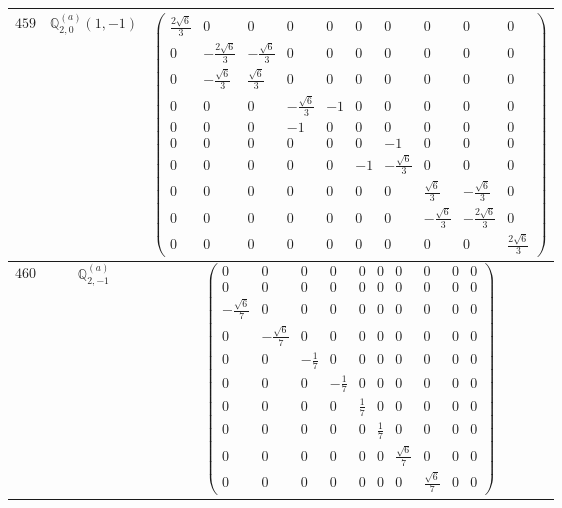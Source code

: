 \documentclass[fleqn,8pt,landscape]{jsarticle}
\begin{document}
\begin{center}
\begin{longtable}{ccc}
$ 459 $ & $ \mathbb{Q}_{2,0}^{(a)}(1,-1) $ & $ \begin{pmatrix} \frac{2 \sqrt{6}}{3} & 0 & 0 & 0 & 0 & 0 & 0 & 0 & 0 & 0 \\ 0 & - \frac{2 \sqrt{6}}{3} & - \frac{\sqrt{6}}{3} & 0 & 0 & 0 & 0 & 0 & 0 & 0 \\ 0 & - \frac{\sqrt{6}}{3} & \frac{\sqrt{6}}{3} & 0 & 0 & 0 & 0 & 0 & 0 & 0 \\ 0 & 0 & 0 & - \frac{\sqrt{6}}{3} & -1 & 0 & 0 & 0 & 0 & 0 \\ 0 & 0 & 0 & -1 & 0 & 0 & 0 & 0 & 0 & 0 \\ 0 & 0 & 0 & 0 & 0 & 0 & -1 & 0 & 0 & 0 \\ 0 & 0 & 0 & 0 & 0 & -1 & - \frac{\sqrt{6}}{3} & 0 & 0 & 0 \\ 0 & 0 & 0 & 0 & 0 & 0 & 0 & \frac{\sqrt{6}}{3} & - \frac{\sqrt{6}}{3} & 0 \\ 0 & 0 & 0 & 0 & 0 & 0 & 0 & - \frac{\sqrt{6}}{3} & - \frac{2 \sqrt{6}}{3} & 0 \\ 0 & 0 & 0 & 0 & 0 & 0 & 0 & 0 & 0 & \frac{2 \sqrt{6}}{3} \end{pmatrix} $ \\ \hline
$ 460 $ & $ \mathbb{Q}_{2,-1}^{(a)} $ & $ \begin{pmatrix} 0 & 0 & 0 & 0 & 0 & 0 & 0 & 0 & 0 & 0 \\ 0 & 0 & 0 & 0 & 0 & 0 & 0 & 0 & 0 & 0 \\ - \frac{\sqrt{6}}{7} & 0 & 0 & 0 & 0 & 0 & 0 & 0 & 0 & 0 \\ 0 & - \frac{\sqrt{6}}{7} & 0 & 0 & 0 & 0 & 0 & 0 & 0 & 0 \\ 0 & 0 & - \frac{1}{7} & 0 & 0 & 0 & 0 & 0 & 0 & 0 \\ 0 & 0 & 0 & - \frac{1}{7} & 0 & 0 & 0 & 0 & 0 & 0 \\ 0 & 0 & 0 & 0 & \frac{1}{7} & 0 & 0 & 0 & 0 & 0 \\ 0 & 0 & 0 & 0 & 0 & \frac{1}{7} & 0 & 0 & 0 & 0 \\ 0 & 0 & 0 & 0 & 0 & 0 & \frac{\sqrt{6}}{7} & 0 & 0 & 0 \\ 0 & 0 & 0 & 0 & 0 & 0 & 0 & \frac{\sqrt{6}}{7} & 0 & 0 \end{pmatrix} $ \\ \hline

\end{longtable}
\end{center}
\end{document}
